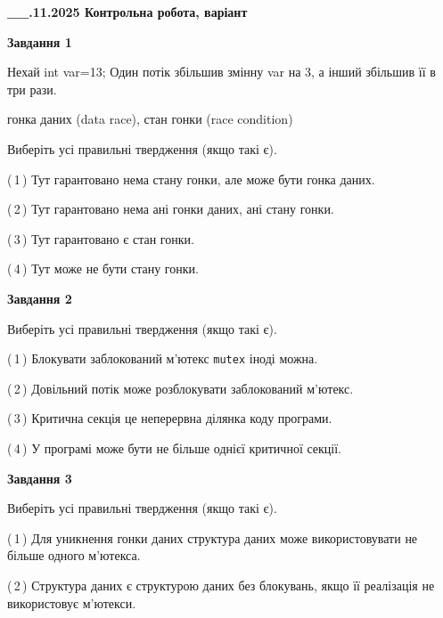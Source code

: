 \documentclass[12pt, ukrainian]{article}
\def\code#1{\Verb!#1!}
\begin{document}
\begin {large}

\textbf{\_\_.11.2025 Контрольна робота, варіант  }\par


{

\begin{center}
\textbf{Завдання 1}
\end{center}
Нехай int var=13; Один потік збільшив змінну var на 3, а інший збільшив її в три рази.

гонка даних (data race), стан гонки (race condition)

Виберіть усі правильні твердження (якщо такі є).\par
\vspace{2mm}
(\,1\,) Тут гарантовано нема стану гонки, але може бути гонка даних.%

(\,2\,) Тут гарантовано нема ані гонки даних, ані стану гонки.%

(\,3\,) Тут гарантовано є стан гонки.%

(\,4\,) Тут може не бути стану гонки.%



\begin{center}
\textbf{Завдання 2}
\end{center}
Виберіть усі правильні твердження (якщо такі є).\par
\vspace{2mm}

(\,1\,) Блокувати заблокований м’ютекс  \code{mutex} іноді можна.%

(\,2\,) Довільний потік може розблокувати заблокований м’ютекс.%

(\,3\,) Критична секція це неперервна ділянка коду програми.%

(\,4\,) У програмі може бути не більше однієї критичної секції.%



\begin{center}
\textbf{Завдання 3}
\end{center}
Виберіть усі правильні твердження (якщо такі є).\par
\vspace{2mm}

(\,1\,) Для уникнення гонки даних структура даних може використовувати не більше одного м’ютекса.%

(\,2\,) Структура даних є структурою даних без блокувань, якщо її реалізація не використовує м’ютекси.%

}
\end{large}
\end{document}
